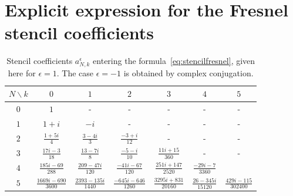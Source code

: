 \documentclass[aps,showpacs,twocolumn,
prd,superscriptaddress,nofootinbib]{revtex4-1}
\newcommand{\jgb}[1]{{\color{DarkGreen} #1}}
\begin{document}
\section{Explicit expression for the \jgb{Fresnel} stencil coefficients}
\label{app:stencil}

\begin{table}[t]
\begin{ruledtabular}\caption{Stencil coefficients $a_{N,k}^{\epsilon}$ entering the formula~\eqref{eq:stencilfresnel}, given here for $\epsilon=1$. The case $\epsilon=-1$ is obtained by complex conjugation.}\label{tab:stencil}
\begin{tabular}{c|cccccc}
	$N \backslash k$ & $0$ & $1$ & $2$ & $3$ & $4$ & $5$ \\
	\hline
	$0$ & $1$ & - & - & - & - & - \\
	$1$ & $1+i$ & $-i$ & - & - & - & - \\
	$2$ & $\frac{1+5i}{4}$ & $\frac{3-4i}{3}$ & $\frac{-3+i}{12}$ & - & - & - \\
	$3$ & $\frac{17 i-3}{18}$ & $\frac{13-7 i}{8}$ & $\frac{-5-i}{10}$ & $\frac{11 i+15}{360}$ & - & - \\
	$4$ & $\frac{185 i-69}{288}$ & $\frac{209-47 i}{120}$ & $\frac{-41 i-67}{120}$ & $\frac{251 i+147}{2520}$ & $\frac{-29 i-7}{3360}$ & \\
	$5$ & $\frac{1669 i-690}{3600}$ & $\frac{2393-135 i}{1440}$ & $\frac{-645 i-646}{1260}$ & $\frac{3295 i+831}{20160}$ & $\frac{26-345 i}{15120}$ & $\frac{429 i-115}{302400}$ \\
\end{tabular}
\end{ruledtabular}
\end{table}
\end{document}

